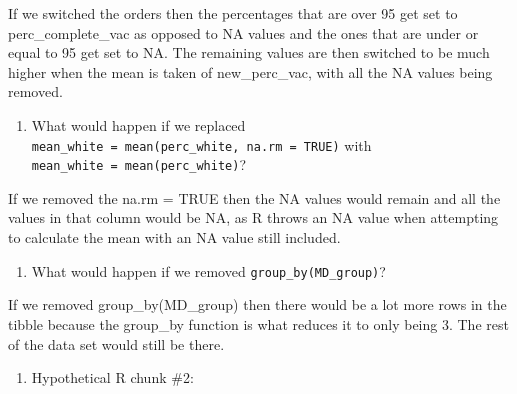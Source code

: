 \documentclass[
  letterpaper,
  DIV=11,
  numbers=noendperiod]{scrartcl}
\providecommand{\tightlist}{%
  \setlength{\itemsep}{0pt}\setlength{\parskip}{0pt}}
\begin{document}
If we switched the orders then the percentages that are over 95 get set
to perc\_complete\_vac as opposed to NA values and the ones that are
under or equal to 95 get set to NA. The remaining values are then
switched to be much higher when the mean is taken of new\_perc\_vac,
with all the NA values being removed.

\begin{enumerate}
\def\labelenumi{\alph{enumi})}
\setcounter{enumi}{2}
\tightlist
\item
  What would happen if we replaced
  \texttt{mean\_white\ =\ mean(perc\_white,\ na.rm\ =\ TRUE)} with
  \texttt{mean\_white\ =\ mean(perc\_white)}?
\end{enumerate}

If we removed the na.rm = TRUE then the NA values would remain and all
the values in that column would be NA, as R throws an NA value when
attempting to calculate the mean with an NA value still included.

\begin{enumerate}
\def\labelenumi{\alph{enumi})}
\setcounter{enumi}{3}
\tightlist
\item
  What would happen if we removed \texttt{group\_by(MD\_group)}?
\end{enumerate}

If we removed group\_by(MD\_group) then there would be a lot more rows
in the tibble because the group\_by function is what reduces it to only
being 3. The rest of the data set would still be there.

\begin{enumerate}
\def\labelenumi{\arabic{enumi}.}
\setcounter{enumi}{8}
\tightlist
\item
  Hypothetical R chunk \#2:
\end{enumerate}
\end{document}
